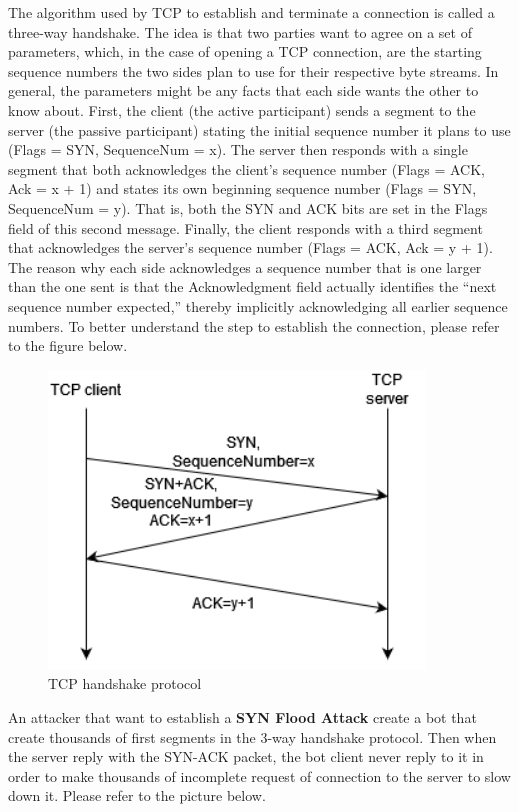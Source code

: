 The algorithm used by TCP to establish and terminate a connection is called a three-way handshake.
The idea is that two parties want to agree on a set of parameters, which, in the case of opening a TCP connection, are the starting sequence numbers the two sides plan to use for their respective byte streams. In general, the parameters might be any facts that each side wants the other to know about. First, the client (the active participant) sends a segment to the server (the passive participant) stating the initial sequence number it plans to use (Flags = SYN, SequenceNum = x). The server then responds with a single segment that both acknowledges the client's sequence number (Flags = ACK, Ack = x + 1) and states its own beginning sequence number (Flags = SYN, SequenceNum = y). That is, both the SYN and ACK bits are set in the Flags field of this second message. Finally, the client responds with a third segment that acknowledges the server's sequence number (Flags = ACK, Ack = y + 1). The reason why each side acknowledges a sequence number that is one larger than the one sent is that the Acknowledgment field actually identifies the “next sequence number expected,” thereby implicitly acknowledging all earlier sequence numbers.
To better understand the step to establish the connection, please refer to the figure below.
\begin{figure}[h!]
  \centering
  \includegraphics[width = 10cm]{images/TCP3wayHANDSHAKE.drawio.png}
  \caption{TCP handshake protocol}
  \label{fig:TCP}
\end{figure}
\FloatBarrier
\noindent

An attacker that want to establish a \textbf{SYN Flood Attack} create a bot that create thousands of first segments in the 3-way handshake protocol. Then when the server reply with the SYN-ACK packet, the bot client never reply to it in order to make thousands of incomplete request of connection to the server to slow down it. Please refer to the picture below.

